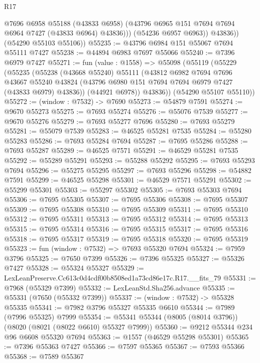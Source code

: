 \begin{lexlean}{R17}
\begin{coremodule}
                @7696
                @6958
                @55188
                (@43833 @6958)
                (@43796 @6965 @151 @7694 @7694 @6964 @7427 (@43833 @6964) @43836)))
            (@54236 @6957 @6963))
          @43836))
      (@54290 @55103 @55106))
@55235 := @43796 @6984 @151 @55067 @7694 @55111 @7427
@55238 := @44894 @6983 @7697 @55066
@55240 := @7396 @6979 @7427
@55271 := fun (value : @1558) =>
  @55098
    (@55119
      (@55229
        (@55235
          (@55238
            (@43668 @55240)
            @55111
            (@43812
              @6982
              @7694
              @7696
              @43667
              @55240
              @43824
              (@43796 @6980 @151 @7694 @7694 @6979 @7427 (@43833 @6979) @43836))
            (@44921 @6978))
          @43836))
      (@54290 @55107 @55110))
@55272 := (window : @7532) -> @7690
@55273 := @54879 @7591
@55274 := @9670 @55273
@55275 := @7693 @55274
@55276 := @55076 @7539
@55277 := @9670 @55276
@55279 := @7693 @55277 @7696
@55280 := @7693 @55279
@55281 := @55079 @7539
@55283 := @46525 @55281 @7535
@55284 := @55280 @55283
@55286 := @7693 @55284 @7694
@55287 := @7695 @55286
@55288 := @7693 @55287
@55289 := @46525 @7571
@55291 := @46529 @55281 @7535
@55292 := @55289 @55291
@55293 := @55288 @55292
@55295 := @7693 @55293 @7694
@55296 := @55275 @55295
@55297 := @7693 @55296
@55298 := @54882 @7591
@55299 := @46525 @55298
@55301 := @46529 @7571 @55291
@55302 := @55299 @55301
@55303 := @55297 @55302
@55305 := @7693 @55303 @7694
@55306 := @7695 @55305
@55307 := @7695 @55306
@55308 := @7695 @55307
@55309 := @7695 @55308
@55310 := @7695 @55309
@55311 := @7695 @55310
@55312 := @7695 @55311
@55313 := @7695 @55312
@55314 := @7695 @55313
@55315 := @7695 @55314
@55316 := @7695 @55315
@55317 := @7695 @55316
@55318 := @7695 @55317
@55319 := @7695 @55318
@55320 := @7695 @55319
@55323 := fun (window : @7532) => @7693 @55320 @7694
@55324 := @7959 @3796
@55325 := @7650 @7399
@55326 := @7396 @55325
@55327 := @55326 @7427
@55328 := @55324 @55327
@55329 := LexLeanPreserve.Cc613c0d4cdf00b8508ed1a73cd86e17c.R17.__fits_79
@55331 := @7968 (@55329 @7399)
@55332 := LexLeanStd.Sha256.advance
@55335 := @55331 (@7650 (@55332 @7399))
@55337 := (window : @7532) -> @55328 @55335
@55341 := @7982 @3796 @55327 @55335 @6610
@55344 := @7989 (@7996 @55325) @7999
@55354 := @55341 @55344 (@8005 (@8014 @3796)) (@8020 (@8021 (@8022 @6610) @55327 @7999))
@55360 := @9212 @55344 @234 @96 @6608 @55320 @7694
@55363 := @1557 (@46529 @55298 @55301)
@55365 := @7396 @55363 @7427
@55366 := @7597 @55365
@55367 := @7593 @55366
@55368 := @7589 @55367

\end{coremodule}
\end{lexlean}
